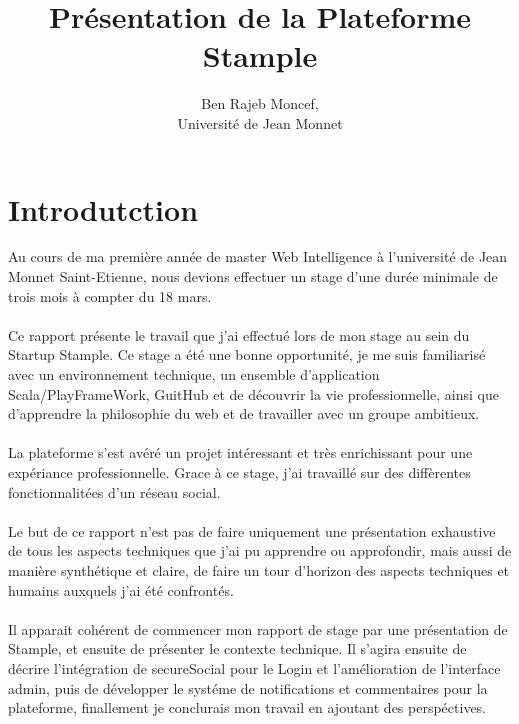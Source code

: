 \documentclass[12pt,oneside,a4paper]{article}
\title{Présentation de la Plateforme Stample\\}
\author{Ben Rajeb Moncef,\\
        Université de Jean Monnet}
\begin{document}
\maketitle
\tableofcontents
\maketitle
\newpage
\section{Introdutction}
Au cours de ma première année de master Web Intelligence à l'université de Jean Monnet Saint-Etienne, nous devions effectuer un stage d'une durée minimale de trois mois à compter du 18 mars.
\paragraph{}
Ce rapport présente le travail que j'ai effectué lors de mon stage au sein du Startup Stample.
\newline
Ce stage a été une bonne opportunité, je me suis familiarisé avec un environnement technique, un ensemble d'application Scala/PlayFrameWork, GuitHub et de découvrir la vie professionnelle, ainsi que d'apprendre la philosophie du web et de travailler avec un groupe ambitieux.
\paragraph{}
La plateforme s'est avéré un projet intéressant et très enrichissant pour une expériance professionnelle. Grace à ce stage, j'ai travaillé sur des diffèrentes fonctionnalitées d'un réseau social.
\paragraph{}
Le but de ce rapport n’est pas de faire uniquement une présentation exhaustive de tous les aspects techniques que j’ai pu apprendre ou approfondir, mais aussi de manière synthétique et claire, de faire un tour d’horizon des aspects techniques et humains auxquels j’ai été confrontés.
\paragraph{}
Il apparait cohérent de commencer mon rapport de stage par une présentation de Stample, et ensuite de présenter le contexte technique. Il s’agira ensuite de décrire l'intégration de secureSocial pour le Login et l'amélioration de l'interface admin, puis de développer le systéme de notifications et commentaires pour la plateforme, finallement je conclurais mon travail en ajoutant des perspéctives.
\newpage
\end{document}
